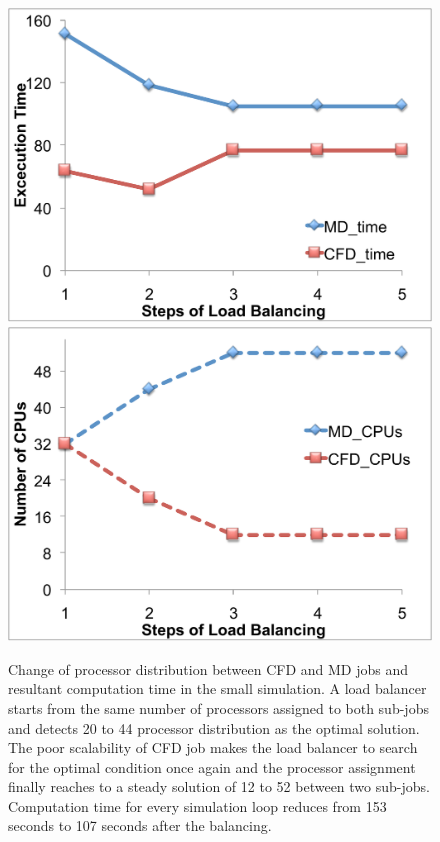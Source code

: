 \documentclass[conference,final]{IEEEtran}
\begin{document}
\begin{figure}
\centering
\includegraphics[scale=0.3]{fig6_1.pdf}
\linebreak
\includegraphics[scale=0.3]{fig6_2.pdf}
\caption{\small Change of processor distribution between CFD and MD jobs and resultant computation time in the small simulation. A load balancer starts from the same number of processors assigned to both sub-jobs and detects 20 to 44 processor distribution as the optimal solution. The poor scalability of CFD job makes the load balancer to search for the optimal condition once again and the processor assignment finally reaches to a steady solution of 12 to 52 between two sub-jobs. Computation time for every simulation loop reduces from 153 seconds to 107 seconds after the balancing.}
\label{Fig:LBSmall}
\end{figure}
\end{document}
